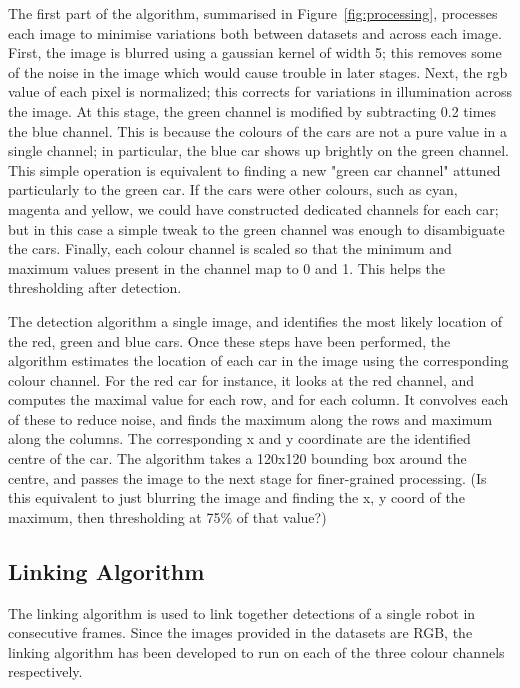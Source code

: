 \documentclass{article}
\begin{document}
The first part of the algorithm, summarised in Figure~\ref{fig:processing}, processes each image to minimise variations both between datasets and across each image. First, the image is blurred using a gaussian kernel of width 5; this removes some of the noise in the image which would cause trouble in later stages. Next, the rgb value of each pixel is normalized; this corrects for variations in illumination across the image. At this stage, the green channel is modified by subtracting 0.2 times the blue channel. This is because the colours of the cars are not a pure value in a single channel; in particular, the blue car shows up brightly on the green channel. This simple operation is equivalent to finding a new "green car channel" attuned particularly to the green car. If the cars were other colours, such as cyan, magenta and yellow, we could have constructed dedicated channels for each car; but in this case a simple tweak to the green channel was enough to disambiguate the cars. Finally, each colour channel is scaled so that the minimum and maximum values present in the channel map to 0 and 1. This helps the thresholding after detection.

The detection algorithm a single image, and identifies the most likely location of the red, green and blue cars.
Once these steps have been performed, the algorithm estimates the location of each car in the image using the corresponding colour channel. For the red car for instance, it looks at the red channel, and computes the maximal value for each row, and for each column. It convolves each of these to reduce noise, and finds the maximum along the rows and maximum along the columns. The corresponding x and y coordinate are the identified centre of the car. The algorithm takes a 120x120 bounding box around the centre, and passes the image to the next stage for finer-grained processing.
(Is this equivalent to just blurring the image and finding the x, y coord of the maximum, then thresholding at 75\% of that value?)

\subsection{Linking Algorithm}
\label{sec:linking}
The linking algorithm is used to link together detections of a single robot in consecutive frames. Since the images provided in the datasets are RGB, the linking algorithm has been developed to run on each of the three colour channels respectively.\\ 
\end{document}

